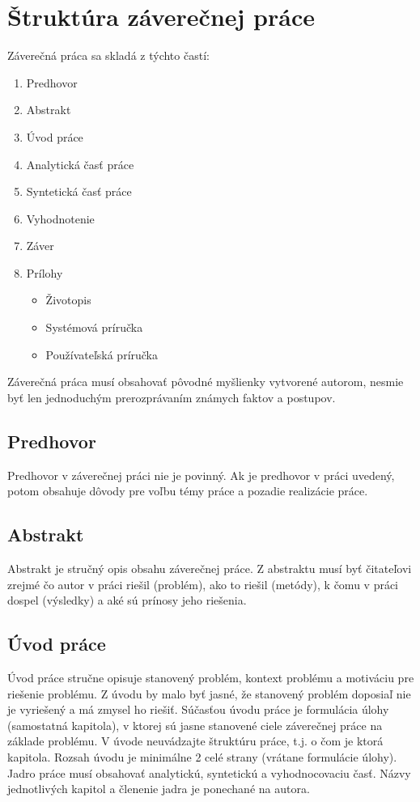 \chapter{Štruktúra záverečnej práce}

Záverečná práca sa skladá z týchto častí:

\begin{enumerate}
    \item Predhovor
    \item Abstrakt
    \item Úvod práce
    \item Analytická časť práce
    \item Syntetická časť práce
    \item Vyhodnotenie
    \item Záver
	\item Prílohy
	\begin{itemize}
	    \item Životopis
	    \item Systémová príručka
	    \item Používateľská príručka
	\end{itemize}
\end{enumerate}

Záverečná práca musí obsahovať pôvodné myšlienky vytvorené autorom, nesmie byť len jednoduchým prerozprávaním známych faktov a postupov.

\section{Predhovor}

Predhovor v záverečnej práci nie je povinný. Ak je predhovor v práci uvedený, potom obsahuje dôvody pre
voľbu témy práce a pozadie realizácie práce.

\section{Abstrakt}

Abstrakt je stručný opis obsahu záverečnej práce. Z abstraktu musí byť čitateľovi zrejmé čo autor v práci
riešil (problém), ako to riešil (metódy), k čomu v práci dospel (výsledky) a aké sú prínosy jeho riešenia.

\section{Úvod práce}

Úvod práce stručne opisuje stanovený problém, kontext problému a motiváciu pre riešenie problému. Z úvodu by malo byť jasné, že stanovený problém doposiaľ nie je vyriešený a má zmysel ho riešiť. Súčasťou úvodu práce je formulácia úlohy (samostatná kapitola), v ktorej sú jasne stanovené ciele záverečnej práce na základe problému. V úvode neuvádzajte štruktúru práce, t.j. o čom je ktorá kapitola. Rozsah úvodu je minimálne 2 celé strany (vrátane formulácie úlohy). Jadro práce musí obsahovať analytickú, syntetickú a vyhodnocovaciu časť. Názvy jednotlivých kapitol a členenie jadra je ponechané na autora.
    
